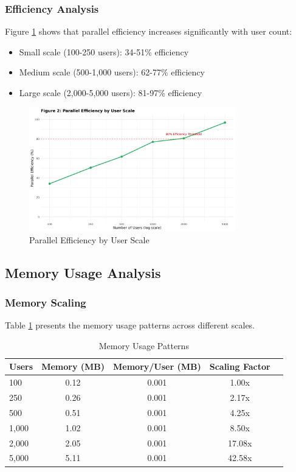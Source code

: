 \documentclass[11pt]{article}
\begin{document}
\subsubsection{Efficiency Analysis}

Figure \ref{fig:efficiency} shows that parallel efficiency increases significantly with user count:
\begin{itemize}
\item Small scale (100-250 users): 34-51\% efficiency
\item Medium scale (500-1,000 users): 62-77\% efficiency
\item Large scale (2,000-5,000 users): 81-97\% efficiency
\end{itemize}

\begin{figure}[H]
\centering
\includegraphics[width=0.8\textwidth]{Figure2_Parallel_Efficiency.png}
\caption{Parallel Efficiency by User Scale}
\label{fig:efficiency}
\end{figure}

\subsection{Memory Usage Analysis}

\subsubsection{Memory Scaling}

Table \ref{tab:memory} presents the memory usage patterns across different scales.

\begin{table}[H]
\centering
\caption{Memory Usage Patterns}
\label{tab:memory}
\begin{tabular}{@{}lcccc@{}}
\toprule
Users & Memory (MB) & Memory/User (MB) & Scaling Factor \\
\midrule
100   & 0.12        & 0.001           & 1.00x         \\
250   & 0.26        & 0.001           & 2.17x         \\
500   & 0.51        & 0.001           & 4.25x         \\
1,000 & 1.02        & 0.001           & 8.50x         \\
2,000 & 2.05        & 0.001           & 17.08x        \\
5,000 & 5.11        & 0.001           & 42.58x        \\
\bottomrule
\end{tabular}
\end{table}
\end{document}
